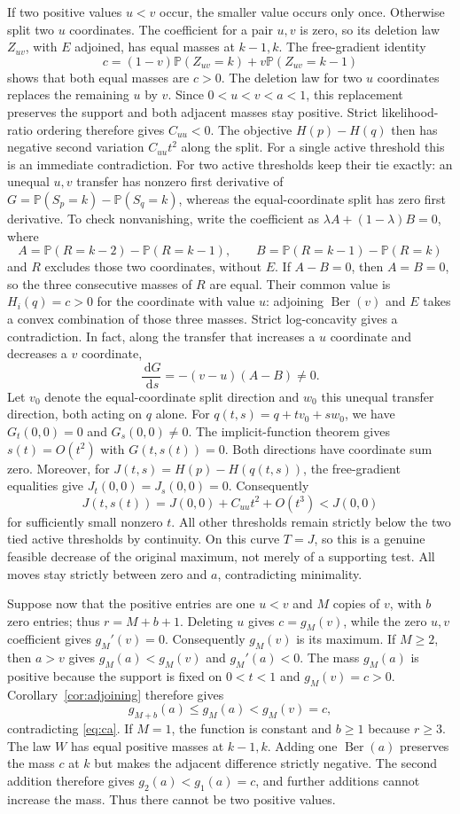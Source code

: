 \documentclass[11pt]{article}
\numberwithin{equation}{section}
\theoremstyle{remark}\newtheorem{remark}[theorem]{Remark}
\DeclareMathOperator{\Ber}{Ber}
\newcommand{\PP}{\mathbb P}
\newcommand{\dd}{\,\mathrm d}
\begin{document}
If two positive values $u<v$ occur, the smaller value occurs only once.
Otherwise split two $u$ coordinates. The coefficient for a pair $u,v$
is zero, so its deletion law $Z_{uv}$, with $E$ adjoined, has equal
masses at $k-1,k$. The free-gradient identity
\[
 c=(1-v)\PP(Z_{uv}=k)+v\PP(Z_{uv}=k-1)
\]
shows that both equal masses are $c>0$. The deletion law for two $u$
coordinates replaces the remaining $u$ by $v$. Since $0<u<v<a<1$,
this replacement preserves the support and both adjacent masses stay
positive. Strict likelihood-ratio ordering therefore gives $C_{uu}<0$. The objective $H(p)-H(q)$ then
has negative second variation $C_{uu}t^2$ along the split.
For a single active threshold this is an immediate contradiction.
For two active thresholds keep their tie exactly: an unequal $u,v$
transfer has nonzero first derivative of
$G=\PP(S_p=k)-\PP(S_q=k)$, whereas the equal-coordinate split has zero
first derivative. To check nonvanishing, write the coefficient as
$\lambda A+(1-\lambda)B=0$, where
\[
 A=\PP(R=k-2)-\PP(R=k-1),\qquad
 B=\PP(R=k-1)-\PP(R=k)
\]
and $R$ excludes those two coordinates, without $E$. If $A-B=0$,
then $A=B=0$, so the three consecutive masses of $R$ are equal.
Their common value is $H_i(q)=c>0$ for the coordinate with value $u$:
adjoining $\Ber(v)$ and $E$ takes a convex combination of those three
masses. Strict log-concavity gives a contradiction. In fact, along the
transfer that increases a $u$ coordinate and decreases a $v$ coordinate,
\[
 \frac{\dd G}{\dd s}=-(v-u)(A-B)\ne0.
\]
Let $v_0$ denote the equal-coordinate split direction and $w_0$ this
unequal transfer direction, both acting on $q$ alone. For
$q(t,s)=q+t v_0+s w_0$, we have $G_t(0,0)=0$ and $G_s(0,0)\ne0$.
The implicit-function theorem gives $s(t)=O(t^2)$ with $G(t,s(t))=0$.
Both directions have coordinate sum zero. Moreover, for
$J(t,s)=H(p)-H(q(t,s))$, the free-gradient equalities give
$J_t(0,0)=J_s(0,0)=0$. Consequently
\[
 J(t,s(t))=J(0,0)+C_{uu}t^2+O(t^3)<J(0,0)
\]
for sufficiently small nonzero $t$. All other thresholds remain
strictly below the two tied active thresholds by continuity. On this
curve $T=J$, so this is a genuine feasible decrease of the original
maximum, not merely of a supporting test. All moves stay strictly
between zero and $a$, contradicting minimality.

Suppose now that the positive entries are one $u<v$ and $M$ copies of
$v$, with $b$ zero entries; thus $r=M+b+1$. Deleting $u$ gives
$c=g_M(v)$, while the zero $u,v$ coefficient gives $g_M'(v)=0$.
Consequently $g_M(v)$ is its maximum. If $M\ge2$, then $a>v$
gives $g_M(a)<g_M(v)$ and $g_M'(a)<0$. The mass $g_M(a)$ is
positive because the support is fixed on $0<t<1$ and $g_M(v)=c>0$.
Corollary~\ref{cor:adjoining} therefore gives
\[
 g_{M+b}(a)\le g_M(a)<g_M(v)=c,
\]
contradicting \eqref{eq:ca}.
If $M=1$, the function is constant and $b\ge1$ because $r\ge3$.
The law $W$ has equal positive masses at $k-1,k$. Adding one
$\Ber(a)$ preserves the mass $c$ at $k$ but makes the adjacent
difference strictly negative. The second addition therefore gives
$g_2(a)<g_1(a)=c$, and further additions cannot increase the mass.
Thus there cannot be two positive values.
\end{document}

